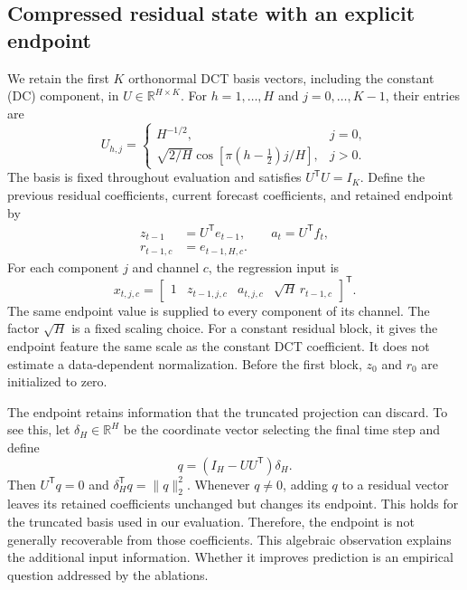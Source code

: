 \subsection{Compressed residual state with an explicit endpoint}
We retain the first $K$ orthonormal DCT basis vectors, including the constant (DC) component, in $U\in\mathbb{R}^{H\times K}$. For $h=1,\ldots,H$ and $j=0,\ldots,K-1$, their entries are
\begin{equation}
 U_{h,j}=\begin{cases}
 H^{-1/2}, & j=0,\\
 \sqrt{2/H}\cos\!\left[\pi(h-\tfrac12)j/H\right], & j>0.
 \end{cases}
 \label{eq:dct_basis}
\end{equation}
The basis is fixed throughout evaluation and satisfies $U^{\mathsf T}U=I_K$. Define the previous residual coefficients, current forecast coefficients, and retained endpoint by
\begin{equation}
 \begin{split}
 z_{t-1}&=U^{\mathsf T}e_{t-1},\qquad a_t=U^{\mathsf T}f_t,\\
 r_{t-1,c}&=e_{t-1,H,c}.
 \end{split}
 \label{eq:retained_features}
\end{equation}
For each component $j$ and channel $c$, the regression input is
\begin{equation}
 x_{t,j,c}=\begin{bmatrix}
 1 & z_{t-1,j,c} & a_{t,j,c} & \sqrt{H}\,r_{t-1,c}
 \end{bmatrix}^{\mathsf T}.
 \label{eq:regression_input}
\end{equation}
The same endpoint value is supplied to every component of its channel. The factor $\sqrt{H}$ is a fixed scaling choice. For a constant residual block, it gives the endpoint feature the same scale as the constant DCT coefficient. It does not estimate a data-dependent normalization. Before the first block, $z_0$ and $r_0$ are initialized to zero.

The endpoint retains information that the truncated projection can discard. To see this, let $\delta_H\in\mathbb{R}^{H}$ be the coordinate vector selecting the final time step and define
\begin{equation}
 q=(I_H-UU^{\mathsf T})\delta_H.
 \label{eq:discarded_direction}
\end{equation}
Then $U^{\mathsf T}q=0$ and $\delta_H^{\mathsf T}q=\lVert q\rVert_2^2$. Whenever $q\ne0$, adding $q$ to a residual vector leaves its retained coefficients unchanged but changes its endpoint. This holds for the truncated basis used in our evaluation. Therefore, the endpoint is not generally recoverable from those coefficients. This algebraic observation explains the additional input information. Whether it improves prediction is an empirical question addressed by the ablations.


